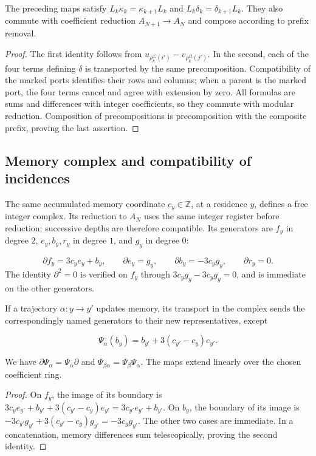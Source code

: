 \begin{proposition}
\label{x_reciprocidad:iv:rectangular-natural}
The preceding maps satisfy
\(L_k\kappa_k=\kappa_{k+1}L_k\) and
\(L_k\delta_k=\delta_{k+1}L_k\).
They also commute with coefficient reduction
\(A_{N+1}\to A_N\) and compose according to prefix removal.
\end{proposition}
\begin{proof}
The first identity follows from
\(u_{\rho_k^\Sigma(i')}-v_{\rho_k^\Pi(j')}\).
In the second, each of the four terms defining \(\delta\)
is transported by the same precomposition. Compatibility of the
marked ports identifies their rows and columns; when a parent is
the marked port, the four terms cancel and agree with
extension by zero. All formulas are sums and differences with
integer coefficients, so they commute with modular reduction.
Composition of precompositions is precomposition with the
composite prefix, proving the last assertion.
\end{proof}

\subsection{Memory complex and compatibility of incidences}
\label{x_reciprocidad:iv:cont:memoria}
The same accumulated memory coordinate \(c_y\in\mathbb Z\), at a residence \(y\), defines a free integer complex. Its reduction to \(A_N\) uses the same integer register before reduction; successive depths are therefore compatible. Its generators are \(f_y\) in degree \(2\), \(e_y,b_y,r_y\) in degree \(1\), and \(g_y\) in degree \(0\):

\[
\partial f_y=3c_y e_y+b_y,\qquad
\partial e_y=g_y,\qquad
\partial b_y=-3c_y g_y,\qquad
\partial r_y=0.
\]
The identity \(\partial^2=0\) is verified on \(f_y\) through \(3c_yg_y-3c_yg_y=0\), and is immediate on the other generators.

If a trajectory \(\alpha:y\to y'\) updates memory, its transport in the complex sends the correspondingly named generators to their new representatives, except

\[
\Psi_\alpha(b_y)=b_{y'}+3(c_{y'}-c_y)e_{y'}.
\]
\begin{proposition}
\label{x_reciprocidad:iv:cont:memoria-natural}
We have \(\partial\Psi_\alpha=\Psi_\alpha\partial\) and \(\Psi_{\beta\alpha}=\Psi_\beta\Psi_\alpha\). The maps extend linearly over the chosen coefficient ring.

\end{proposition}
\begin{proof}
On \(f_y\), the image of its boundary is \(3c_ye_{y'}+b_{y'}+3(c_{y'}-c_y)e_{y'} =3c_{y'}e_{y'}+b_{y'}\). On \(b_y\), the boundary of its image is \(-3c_{y'}g_{y'}+3(c_{y'}-c_y)g_{y'}=-3c_yg_{y'}\). The other two cases are immediate. In a concatenation, memory differences sum telescopically, proving the second identity.
\end{proof}

